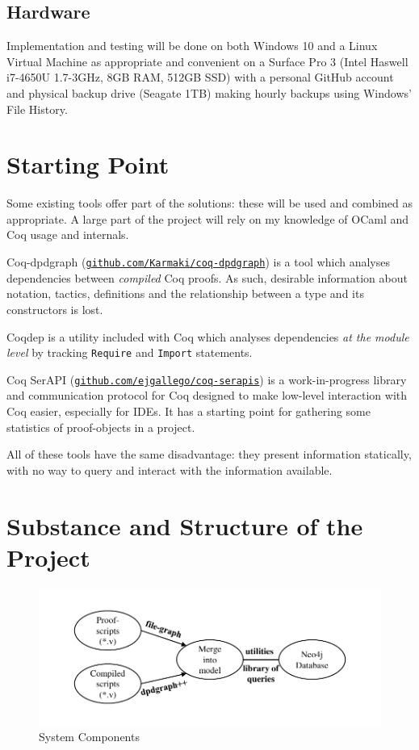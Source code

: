\documentclass[12pt]{article}
\begin{document}
\subsection*{Hardware}
Implementation and testing will be done on both Windows 10 and a Linux Virtual
Machine as appropriate and convenient on a Surface Pro 3 (Intel Haswell i7-4650U
1.7-3GHz, 8GB RAM, 512GB SSD) with a personal GitHub account and physical backup
drive (Seagate 1TB) making hourly backups using Windows' File History.

\section*{Starting Point}
Some existing tools offer part of the solutions: these will be used and
combined as appropriate. A large part of the project will rely on my knowledge of
OCaml and Coq usage and internals.

Coq-dpdgraph
(\href{http://github.com/Karmaki/coq-dpdgraph}{\texttt{github.com/Karmaki/coq-dpdgraph}})
is a tool which analyses dependencies between \emph{compiled} Coq proofs. As
such, desirable information about notation, tactics, definitions and the
relationship between a type and its constructors is lost.

Coqdep is a utility included with Coq which analyses dependencies \emph{at the
module level} by tracking {\tt Require} and {\tt Import} statements.

Coq SerAPI
(\href{http://github.com/ejgallego/coq-serapis}{\texttt{github.com/ejgallego/coq-serapis}})
is a work-in-progress library and communication protocol for Coq designed to
make low-level interaction with Coq easier, especially for IDEs. It has a
starting point for gathering some statistics of proof-objects in a project.

All of these tools have the same disadvantage: they present information statically,
with no way to query and interact with the information available.

\section*{Substance and Structure of the Project}
\begin{figure}[tb]
	\centering
	\includegraphics[width=\textwidth, page=1]{proposal/proposal-project-structure-diagram.pdf} 
	\caption{System Components}
	\label{fig:structure}
\end{figure}
\end{document}

